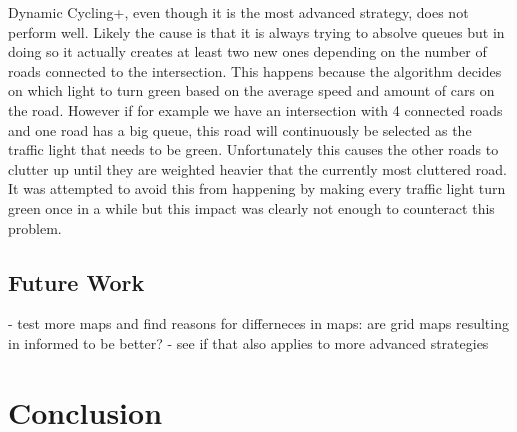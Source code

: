 \documentclass[11pt]{article}
\begin{document}
Dynamic Cycling+, even though it is the most advanced strategy, does not perform well. Likely the cause is that it is always trying to absolve queues but in doing so it actually creates at least two new ones depending on the number of roads connected to the intersection. This happens because the algorithm decides on which light to turn green based on the average speed and amount of cars on the road. However if for example we have an intersection with 4 connected roads and one road has a big queue, this road will continuously be selected as the traffic light that needs to be green. Unfortunately this causes the other roads to clutter up until they are weighted heavier that the currently most cluttered road. It was attempted to avoid this from happening by making every traffic light turn green once in a while but this impact was clearly not enough to counteract this problem.

\subsection{Future Work}

- test more maps and find reasons for differneces in maps: are grid maps resulting in informed to be better?
- see if that also applies to more advanced strategies


\section{Conclusion}
\label{sec:conclusion}


{\tiny\printbibliography}
\end{document}
